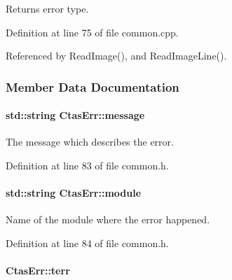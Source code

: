Returns error type. 



Definition at line 75 of file common.cpp.



Referenced by ReadImage(), and ReadImageLine().



\subsubsection{Member Data Documentation}
\hypertarget{classCtasErr_a9814f39f8f3c93d77d45209c8808a591}{
\paragraph[{message}]{\setlength{\rightskip}{0pt plus 5cm}std::string {\bf CtasErr::message}}\hfill}
\label{classCtasErr_a9814f39f8f3c93d77d45209c8808a591}


The message which describes the error. 



Definition at line 83 of file common.h.

\hypertarget{classCtasErr_a9ff7fe473d7b44c9d7e3bace22e24eff}{
\paragraph[{module}]{\setlength{\rightskip}{0pt plus 5cm}std::string {\bf CtasErr::module}}\hfill}
\label{classCtasErr_a9ff7fe473d7b44c9d7e3bace22e24eff}


Name of the module where the error happened. 



Definition at line 84 of file common.h.

\hypertarget{classCtasErr_a316f1b4382d548d47413aff1b57c18e3}{
\paragraph[{terr}]{ {\bf CtasErr::terr}}\hfill}
\label{classCtasErr_a316f1b4382d548d47413aff1b57c18e3}


